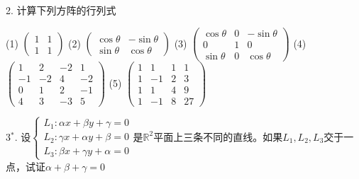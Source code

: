 
\begin{frame}

2. 计算下列方阵的行列式

(1) $\begin{pmatrix} 1 & 1 \\ 1 & 1 \end{pmatrix}$ \quad (2) $\begin{pmatrix} \cos\theta & -\sin\theta \\ \sin\theta & \cos\theta \end{pmatrix}$ \quad (3) $\begin{pmatrix} \cos\theta & 0 & -\sin\theta \\ 0 & 1 & 0 \\ \sin\theta & 0 & \cos\theta \end{pmatrix}$ \newline
\vspace{0.5em}
(4) $\begin{pmatrix} 1 & 2 & -2 & 1 \\ -1 & -2 & 4 & -2 \\ 0 & 1 & 2 & -1 \\ 4 & 3 & -3 & 5 \end{pmatrix}$ \quad (5) $\begin{pmatrix} 1 & 1 & 1 & 1 \\ 1 & -1 & 2 & 3 \\ 1 & 1 & 4 & 9 \\ 1 & -1 & 8 & 27 \end{pmatrix}$

\vspace{1em}

3$^*$. 设$\left\{ \begin{array}{rcl} L_1: \alpha x + \beta y + \gamma = 0 \\ L_2: \gamma x + \alpha y + \beta = 0 \\ L_3: \beta x + \gamma y + \alpha = 0\end{array}\right.$是$\mathbb{R}^2$平面上三条不同的直线。如果$L_1, L_2, L_3$交于一点，试证$\alpha + \beta + \gamma = 0$

\end{frame}


